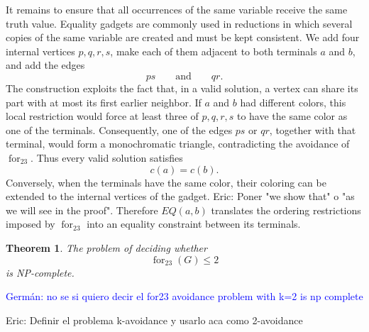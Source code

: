 \documentclass[12pt]{article}
\theoremstyle{plain}
\newtheorem{theorem}{Theorem}[section]
\theoremstyle{definition}
\theoremstyle{remark}
\theoremstyle{definition}
\newcommand{\forlabel}{\mathrm{for}}
\DeclareRobustCommand{\forparam}[1]{%
  \ensuremath{\mathop{\forlabel}\nolimits_{#1}}%
}
\newcommand{\eric}[1]{%
  \textcolor{green!50!black}{Eric: #1}%
}
\newcommand{\german}[1]{%
  \textcolor{blue}{Germán: #1}%
}
\begin{document}
It remains to ensure that all occurrences of the same variable receive the same truth value. Equality gadgets are
commonly used in reductions in which several copies of the same variable are created and must be kept consistent. We add four internal
vertices \(p,q,r,s\), make each of them adjacent to both terminals \(a\) and \(b\), and add the edges
\[
ps
\qquad\text{and}\qquad
qr.
\]
The construction exploits the fact that, in a valid solution, a vertex can share its part with at most its first
earlier neighbor. If \(a\) and \(b\) had different colors, this local restriction would force at least three of
\(p,q,r,s\) to have the same color as one of the terminals. Consequently, one of the edges \(ps\) or \(qr\), together
with that terminal, would form a monochromatic triangle, contradicting the avoidance of
\(\operatorname{for}_{23}\). Thus every valid solution satisfies
\[
c(a)=c(b).
\]
Conversely, when the terminals have the same color, their coloring can be extended to the internal vertices of the
gadget.\eric{Poner "we show that" o "as we will see in the proof".} Therefore \(EQ(a,b)\) translates the ordering restrictions imposed by \(\operatorname{for}_{23}\) into an
equality constraint between its terminals.


\begin{theorem}\label{thm:for23-k2-np-complete}
The problem of deciding whether
\[
\forparam{23}(G)\le 2
\]
is NP-complete.
\end{theorem}
\german{no se si quiero decir el for23 avoidance problem with k=2 is np complete}
\eric{Definir el problema k-avoidance y usarlo aca como 2-avoidance}
\end{document}
